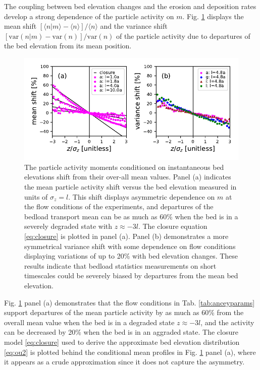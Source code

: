 The coupling between bed elevation changes and the erosion and deposition rates develop a strong dependence of the particle activity on $m$. Fig. \ref{fig:condmoms} displays the mean shift $[\langle n |m \rangle - \langle n \rangle]/\langle n \rangle $ and the variance shift  $[\text{var}(n|m) - \text{var}(n)]/\text{var}(n)$ of the particle activity due to departures of the bed elevation from its mean position.
\begin{figure}[!htbp]
	\includegraphics[width=\linewidth,keepaspectratio]{./figures/ch3/momentsuppression.pdf}
	\caption{The particle activity moments conditioned on instantaneous bed elevations shift from their over-all mean values. Panel (a) indicates the mean particle activity shift versus the bed elevation measured in units of $\sigma_z=l$. This shift displays asymmetric dependence on $m$ at the flow conditions of the \citet{Ancey2008} experiments, and departures of the bedload transport mean can be as much as 60\% when the bed is in a severely degraded state with $z\approx -3l$. The closure equation \ref{eq:closure} is plotted in panel (a). Panel (b) demonstrates a more symmetrical variance shift with some dependence on flow conditions displaying variations of up to 20\% with bed elevation changes. These results indicate that bedload statistics measurements on short timescales could be severely biased by departures from the mean bed elevation.}
	\label{fig:condmoms}
\end{figure}
Fig. \ref{fig:condmoms} panel (a) demonstrates that the flow conditions in Tab. \ref{tab:anceyparams} support departures of the mean particle activity by as much as 60\% from the overall mean value when the bed is in a degraded state $z\approx -3l$, and the activity can be decreased by 20\% when the bed is in an aggraded state.
The closure model \ref{eq:closure} used to derive the approximate bed elevation distribution \ref{eq:ou2} is plotted behind the conditional mean profiles in Fig. \ref{fig:condmoms} panel (a), where it appears as a crude approximation since it does not capture the asymmetry.
